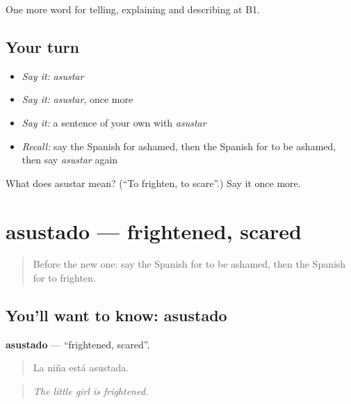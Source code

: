 \begin{grammarlens}[title={What you've built}]
One more word for telling, explaining and describing at B1.
\end{grammarlens}

\subsection*{Your turn}
\begin{itemize}
\raggedright
  \item \emph{Say it:} \emph{asustar}
  \item \emph{Say it:} \emph{asustar}, once more
  \item \emph{Say it:} a sentence of your own with \emph{asustar}
  \item \emph{Recall:} say the Spanish for ashamed, then the Spanish for to be ashamed, then say \emph{asustar} again
\end{itemize}

\begin{tcolorbox}[breakable,colback=teal!4,colframe=teal!35!black,title={Before you move on}]
What does asustar mean? (\textquotedblleft{}To frighten, to scare\textquotedblright{}.) Say it once more.
\end{tcolorbox}
\section[asustado]{asustado — frightened, scared}

\label{lesson:ES-C706-asustado}



\begin{quote}
Before the new one: say the Spanish for to be ashamed, then the Spanish for to frighten.
\end{quote}

\subsection*{You'll want to know: asustado}
\textbf{asustado} — \textquotedblleft{}frightened, scared\textquotedblright{}.

\begin{quote}
La niña está asustada.
\end{quote}

\begin{quote}
\emph{The little girl is frightened.}
\end{quote}

